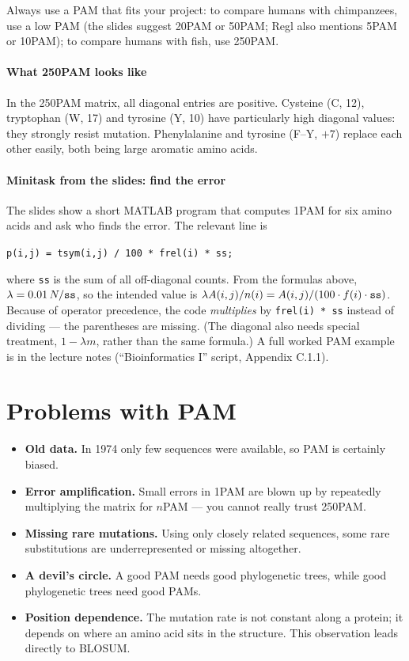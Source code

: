 \documentclass[11pt, oneside]{book}
\let\originalsection\section
\renewcommand{\section}{\Needspace{7\baselineskip}\originalsection}
\begin{document}
Always use a PAM that fits your project: to compare humans with chimpanzees,
use a low PAM (the slides suggest 20PAM or 50PAM; Regl also mentions 5PAM or
10PAM); to compare humans with fish, use 250PAM.

\paragraph{What 250PAM looks like}
In the 250PAM matrix, all diagonal entries are positive. Cysteine (C, 12),
tryptophan (W, 17) and tyrosine (Y, 10) have particularly high diagonal values:
they strongly resist mutation. Phenylalanine and tyrosine (F--Y, $+7$) replace
each other easily, both being large aromatic amino acids.

\paragraph{Minitask from the slides: find the error}
The slides show a short MATLAB program that computes 1PAM for six amino acids
and ask who finds the error. The relevant line is
\begin{center}
\verb|p(i,j) = tsym(i,j) / 100 * frel(i) * ss;|
\end{center}
where \verb|ss| is the sum of all off-diagonal counts. From the formulas above,
$\lambda = 0.01\,N/\verb|ss|$, so the intended value is
$\lambda A(i,j)/n(i) = A(i,j) / (100 \cdot f(i) \cdot \verb|ss|)$. Because of
operator precedence, the code \emph{multiplies} by \verb|frel(i) * ss|
instead of dividing --- the parentheses are missing. (The diagonal also needs
special treatment, $1 - \lambda m$, rather than the same formula.) A full
worked PAM example is in the lecture notes (``Bioinformatics I'' script,
Appendix C.1.1).

\section{Problems with PAM}

\begin{itemize}
  \item \textbf{Old data.} In 1974 only few sequences were available, so PAM is
    certainly biased.
  \item \textbf{Error amplification.} Small errors in 1PAM are blown up by
    repeatedly multiplying the matrix for $n$PAM --- you cannot really trust
    250PAM.
  \item \textbf{Missing rare mutations.} Using only closely related sequences,
    some rare substitutions are underrepresented or missing altogether.
  \item \textbf{A devil's circle.} A good PAM needs good phylogenetic trees,
    while good phylogenetic trees need good PAMs.
  \item \textbf{Position dependence.} The mutation rate is not constant along a
    protein; it depends on where an amino acid sits in the structure. This
    observation leads directly to BLOSUM.
\end{itemize}
\end{document}
